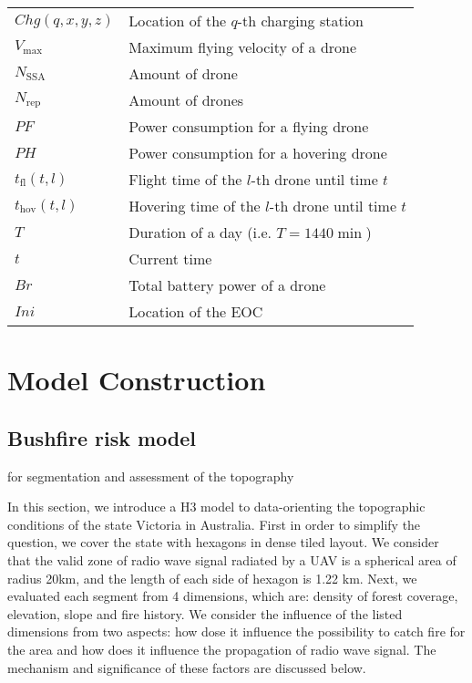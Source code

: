 \documentclass[13pt]{ctexart} %
\begin{document}
\begin{table}[h]
\begin{tabular}{>{\centering\arraybackslash}p{6em}>{\centering\arraybackslash}p{30em}}
        $Chg
        (q,x,y,z)$       & Location of the $q$-th charging station \\
        $V_{\text{max}}$ & Maximum flying velocity of a drone      \\
        $N_{\text{SSA}}$ & Amount of drone
        \uppercase\expandafter{\romannumeral1}                     \\
        $N_{\text{rep}}$ & Amount of drones
        \uppercase\expandafter{\romannumeral2}                     \\
        $PF$             & Power consumption for a flying drone    \\
        $PH$             & Power consumption for a hovering drone  \\
        $t_{\text{fl}}
        (t,l)$           & Flight time of the $l$-th drone
        until time $t$                                             \\
        $t_{\text{hov}}
        (t,l)$           & Hovering time of the $l$-th drone
        until time $t$                                             \\
        $T$              & Duration of a day (i.e. $T=1440 \min$)  \\
        $t$              & Current time                            \\
        $Br$             & Total battery power of a drone          \\
        $Ini$            & Location of the EOC                     \\
        \bottomrule
    \end{tabular}
\end{table}
\section{Model Construction}
\subsection{Bushfire risk model}

for segmentation and assessment of the topography

In this section, we introduce a H3 model to data-orienting the topographic conditions of the state Victoria in Australia. First in order to simplify the question, we cover the state with hexagons in dense tiled layout. We consider that the valid zone of radio wave signal radiated by a UAV is a spherical area of radius 20km, and the length of each side of hexagon is 1.22 km. Next, we evaluated each segment from 4 dimensions, which are: density of forest coverage, elevation, slope and fire history. We consider the influence of the listed dimensions from two aspects: how dose it influence the possibility to catch fire for the area and how does it influence the propagation of radio wave signal. The mechanism and significance of these factors are discussed below.
\end{document}
